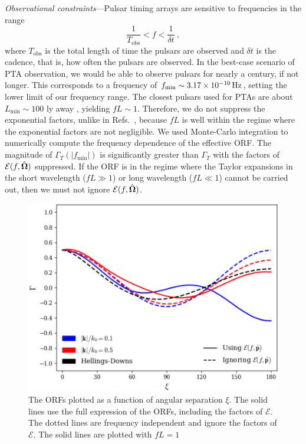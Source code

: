 \documentclass[prd,twocolumn,aps,psfig,nofootinbib,nobibnotes,superscriptaddress,preprintnumbers,times]{revtex4-2}
\newcommand{\Hz}{\,{\rm Hz}}
\begin{document}
\textit{Observational constraints}---Pulsar timing arrays are sensitive to frequencies in the range \cite{Moore:2014lga}
\begin{equation}\label{eq:freqrange}
    \frac{1}{T_{\text{obs}}} < f < \frac{1}{\delta t}\ ,
\end{equation} 
where $T_{\text{obs}}$ is the total length of time the pulsars are observed and $\delta t$ is the cadence, that is, how often the pulsars are observed. 
In the best-case scenario of PTA observation, we would be able to observe pulsars for nearly a century, if not longer. This corresponds to a frequency of $f_{\text{min}} \sim 3.17 \times 10^{-10} \Hz$, setting the lower limit of our frequency range. The closest pulsars used for PTAs are about $L_{\text{min}} \sim 100$ ly away \cite{Anholm:2008wy}, yielding $fL \sim 1$. Therefore, we do not suppress the exponential factors, unlike in Refs.~\cite{Liang:2021bct,Arjona:2024cex}, because $fL$ is well within the regime where the exponential factors are not negligible.
We used Monte-Carlo integration to numerically compute the frequency dependence of the effective ORF. The magnitude of $\Gamma_T(|f_{\text{min}}|)$ is significantly greater than $\Gamma_T$ with the factors of $\mathcal{E}(f, \hat{\bf \Omega})$ suppressed. If the ORF is in the regime where the Taylor expansions in the short wavelength ($fL \gg 1$) or long wavelength ($fL \ll 1$) cannot be carried out, then we must not ignore $\mathcal{E}(f, \hat{\bf \Omega})$.
\begin{figure}[ht]
    \centering
    \includegraphics[scale=0.48]{fig1.pdf}
    \caption{The ORFs plotted as a function of angular separation $\xi$. The solid lines use the full expression of the ORFs, including the factors of $\mathcal{E}$. The dotted lines are frequency independent and ignore the factors of $\mathcal{E}$. The solid lines are plotted with $fL = 1$}
    \label{fig:orfs}
\end{figure}
\end{document}
